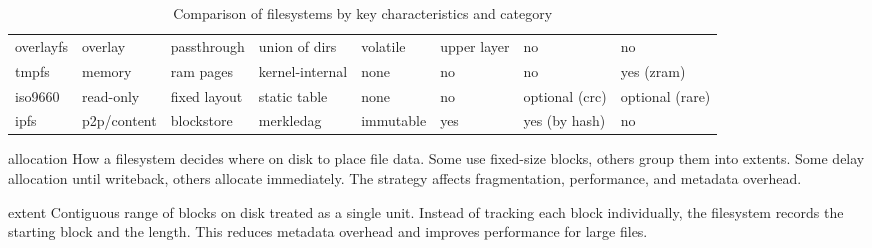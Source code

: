\documentclass[openany, 12pt]{book}
\begin{document}
\begin{table}[h]
{\begin{tabular}{llllllll}
			overlayfs    & overlay     & passthrough  & union of dirs   & volatile       & upper layer  & no             & no              \\
			tmpfs        & memory      & ram pages    & kernel-internal & none           & no           & no             & yes (zram)      \\
			iso9660      & read-only   & fixed layout & static table    & none           & no           & optional (crc) & optional (rare) \\
			ipfs         & p2p/content & blockstore   & merkledag       & immutable      & yes          & yes (by hash)  & no              \\
			\bottomrule
		\end{tabular}
	}
	\caption{Comparison of filesystems by key characteristics and category}
\end{table}

\begin{definition}{allocation}{}
	How a filesystem decides where on disk to place file data. Some use
	fixed-size blocks, others group them into extents. Some delay allocation
	until writeback, others allocate immediately. The strategy affects
	fragmentation, performance, and metadata overhead.
\end{definition}

\begin{definition}{extent}{}
	Contiguous range of blocks on disk treated as a single unit. Instead of
	tracking each block individually, the filesystem records the starting block
	and the length. This reduces metadata overhead and improves performance for
	large files.
\end{definition}
\end{document}
